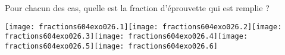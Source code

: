 Pour chacun des cas, quelle est la fraction d'éprouvette qui est remplie ?
\par
\texttt{[image: fractions604exo026.1]}\hfill\texttt{[image: fractions604exo026.2]}\hfill\texttt{[image: fractions604exo026.3]}\hfill\texttt{[image: fractions604exo026.4]}\hfill\texttt{[image: fractions604exo026.5]}\hfill\texttt{[image: fractions604exo026.6]}